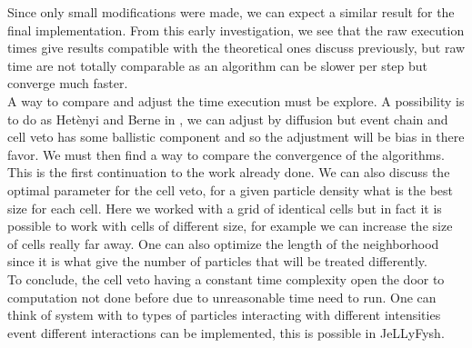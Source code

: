 \documentclass[jcp,twocolumn,longbibliography,superscriptaddress]{revtex4-2}
\begin{document}
	Since only small modifications were made, we can expect a similar result for the final implementation.
	From this early investigation, we see that the raw execution times give results compatible with the theoretical ones discuss previously, but raw time are not totally comparable as an algorithm can be slower per step but converge much faster.\\
	
	\newpage
	A way to compare and adjust the time execution must be explore. A possibility is to do as Hetènyi and Berne in \cite{Berne2002}, we can adjust by diffusion but event chain and cell veto has some ballistic component and so the adjustment will be bias in there favor. We must then find a way to compare the convergence of the algorithms.\\
	
	This is the first continuation to the work already done. We can also discuss the optimal parameter for the cell veto, for a given particle density what is the best size for each cell. Here we worked with a grid of identical cells but in fact it is possible to work with cells of different size, for example we can increase the size of cells really far away. One can also optimize the length of the neighborhood since it is what give the number of particles that will be treated differently.\\
	
	To conclude, the cell veto having a constant time complexity open the door to computation not done before due to unreasonable time need to run. One can think of system with to types of particles interacting with different intensities event different interactions can be implemented, this is possible in JeLLyFysh.
	
	
	
	
\end{document}
